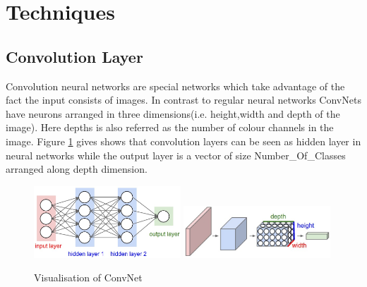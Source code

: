 \documentclass[fleqn,10pt]{SelfArx} %
\begin{document}
\section{Techniques}

\subsection{Convolution Layer}
Convolution neural networks are special networks which take advantage of the fact the input consists of images. In contrast to regular neural networks ConvNets have neurons arranged in three dimensions(i.e. height,width and depth of the image). Here depths is also referred as the number of colour channels in the image.
\newline
Figure \ref{fig:convNet} gives shows that  convolution layers can be seen as hidden layer in neural networks while the output layer is a vector of size Number\_Of\_Classes arranged along depth dimension.
\begin{figure}[ht]\centering
\includegraphics[width=0.49\textwidth]{neural_net}
\includegraphics[width=0.49\textwidth]{cnn}
\caption{Visualisation of ConvNet}
\label{fig:convNet}
\end{figure}
\end{document}
